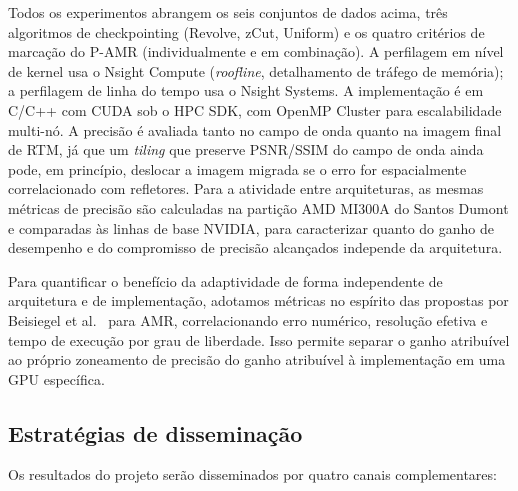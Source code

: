 \documentclass[12pt,a4paper]{article}
\newcommand{\pamr}{P\nobreakdash-AMR}
\begin{document}
Todos os experimentos abrangem os seis conjuntos de dados acima, três
algoritmos de checkpointing (Revolve, zCut, Uniform) e os quatro
critérios de marcação do \pamr{} (individualmente e em combinação). A
perfilagem em nível de kernel usa o Nsight Compute (\emph{roofline},
detalhamento de tráfego de memória); a perfilagem de linha do tempo usa o
Nsight Systems. A implementação é em C/C++ com CUDA sob o HPC SDK, com OpenMP
Cluster para escalabilidade multi-nó. A precisão é avaliada tanto no campo de
onda quanto na imagem final de RTM, já que um \emph{tiling} que preserve
PSNR/SSIM do campo de onda ainda pode, em princípio, deslocar a imagem migrada
se o erro for espacialmente correlacionado com refletores. Para a atividade
entre arquiteturas, as mesmas métricas de precisão são calculadas na partição
AMD MI300A do Santos Dumont e comparadas às linhas de base NVIDIA, para
caracterizar quanto do ganho de desempenho e do compromisso de precisão
alcançados independe da arquitetura.

Para quantificar o benefício da adaptividade de forma independente de
arquitetura e de implementação, adotamos métricas no espírito das propostas
por Beisiegel et al.~\cite{beisiegel2021metrics} para AMR, correlacionando
erro numérico, resolução efetiva e tempo de execução por grau de liberdade.
Isso permite separar o ganho atribuível ao próprio zoneamento de precisão do
ganho atribuível à implementação em uma GPU específica.

\subsection{Estratégias de disseminação}

Os resultados do projeto serão disseminados por quatro canais
complementares:
\end{document}

